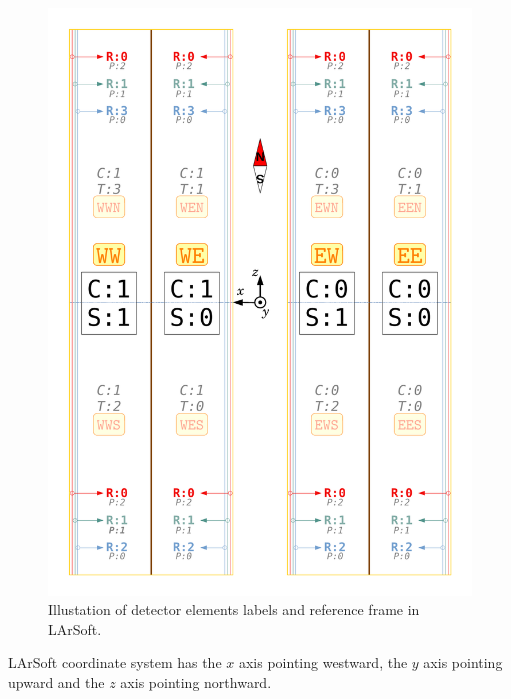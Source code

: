 \begin{figure}[p]
  \begin{center}
    \includegraphics[height=0.90\textheight]{figures/LArSoftLabels}
  \end{center}
  \caption{
    Illustation of detector elements labels and reference frame in LArSoft.
    \label{fig:LArSoftLabels}
  }
\end{figure}

LArSoft coordinate system has the $x$ axis pointing westward,
the $y$ axis pointing upward and the $z$ axis pointing northward.

